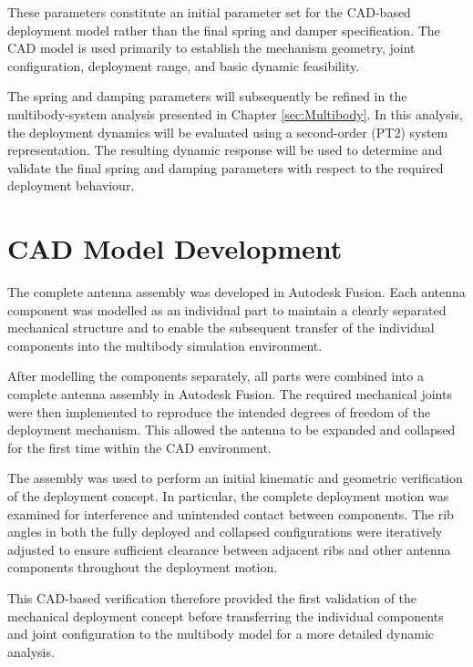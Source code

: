 These parameters constitute an initial parameter set for the CAD-based deployment model rather than the final spring and damper specification. The CAD model is used primarily to establish the mechanism geometry, joint configuration, deployment range, and basic dynamic feasibility.

The spring and damping parameters will subsequently be refined in the multibody-system analysis presented in Chapter \ref{sec:Multibody}. In this analysis, the deployment dynamics will be evaluated using a second-order (PT2) system representation. The resulting dynamic response will be used to determine and validate the final spring and damping parameters with respect to the required deployment behaviour.
\newpage
\section{CAD Model Development }

The complete antenna assembly was developed in Autodesk Fusion. Each antenna component was modelled as an individual part to maintain a clearly separated mechanical structure and to enable the subsequent transfer of the individual components into the multibody simulation environment.

After modelling the components separately, all parts were combined into a complete antenna assembly in Autodesk Fusion. The required mechanical joints were then implemented to reproduce the intended degrees of freedom of the deployment mechanism. This allowed the antenna to be expanded and collapsed for the first time within the CAD environment.

The assembly was used to perform an initial kinematic and geometric verification of the deployment concept. In particular, the complete deployment motion was examined for interference and unintended contact between components. The rib angles in both the fully deployed and collapsed configurations were iteratively adjusted to ensure sufficient clearance between adjacent ribs and other antenna components throughout the deployment motion.

This CAD-based verification therefore provided the first validation of the mechanical deployment concept before transferring the individual components and joint configuration to the multibody model for a more detailed dynamic analysis.


